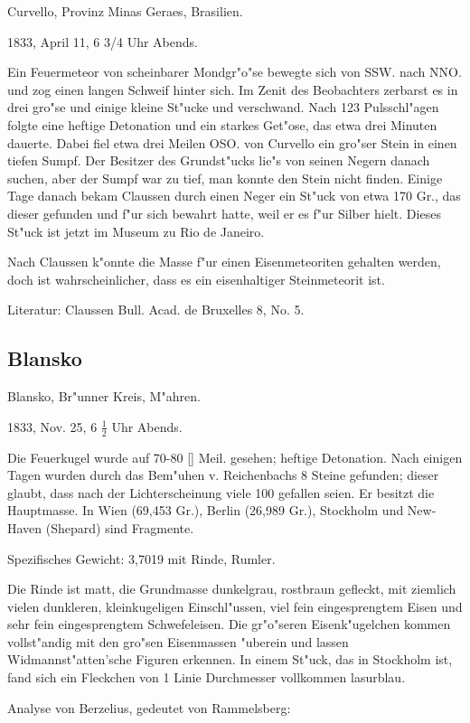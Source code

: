 \documentclass[a4paper, 11pt, oneside]{article}
\begin{document}
Curvello, Provinz Minas Geraes, Brasilien.

1833, April 11, 6 3/4 Uhr Abends.

Ein Feuermeteor von scheinbarer Mondgr"o"se bewegte sich von SSW. nach NNO. und zog einen langen Schweif hinter sich. Im Zenit des Beobachters zerbarst es in drei gro"se und einige kleine St"ucke und verschwand. Nach 123 Pulsschl"agen folgte eine heftige Detonation und ein starkes Get"ose, das etwa drei Minuten dauerte. Dabei fiel etwa drei Meilen OSO. von Curvello ein gro"ser Stein in einen tiefen Sumpf. Der Besitzer des Grundst"ucks lie"s von seinen Negern danach suchen, aber der Sumpf war zu tief, man konnte den Stein nicht finden. Einige Tage danach bekam Claussen durch einen Neger ein St"uck von etwa 170 Gr., das dieser gefunden und f"ur sich bewahrt hatte, weil er es f"ur Silber hielt. Dieses St"uck ist jetzt im Museum zu Rio de Janeiro.

Nach Claussen k"onnte die Masse f"ur einen Eisenmeteoriten gehalten werden, doch ist wahrscheinlicher, dass es ein eisenhaltiger Steinmeteorit ist.

Literatur: Claussen Bull. Acad. de Bruxelles 8, No. 5.

\subsection{Blansko}

Blansko, Br"unner Kreis, M"ahren.

1833, Nov. 25, 6 $\frac{1}{2}$ Uhr Abends.

Die Feuerkugel wurde auf 70-80 [] Meil. gesehen; heftige Detonation. Nach einigen Tagen wurden durch das Bem"uhen v. Reichenbachs 8 Steine gefunden; dieser glaubt, dass nach der Lichterscheinung viele 100 gefallen seien. Er besitzt die Hauptmasse. In Wien (69,453 Gr.), Berlin (26,989 Gr.), Stockholm und New-Haven (Shepard) sind Fragmente.

Spezifisches Gewicht: 3,7019 mit Rinde, Rumler.

Die Rinde ist matt, die Grundmasse dunkelgrau, rostbraun gefleckt, mit ziemlich vielen dunkleren, kleinkugeligen Einschl"ussen, viel fein eingesprengtem Eisen und sehr fein eingesprengtem Schwefeleisen. Die gr"o"seren Eisenk"ugelchen kommen vollst"andig mit den gro"sen Eisenmassen "uberein und lassen Widmannst"atten'sche Figuren erkennen. In einem St"uck, das in Stockholm ist, fand sich ein Fleckchen von 1 Linie Durchmesser vollkommen lasurblau.

Analyse von Berzelius, gedeutet von Rammelsberg:
\end{document}
